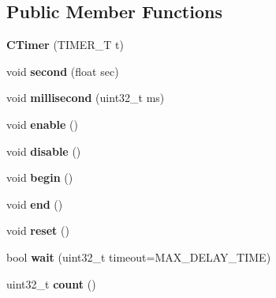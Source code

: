 \subsection*{Public Member Functions}
\begin{DoxyCompactItemize}
\item 
\hypertarget{class_c_timer_a01988907cb23d887bf9db237ecac1d8f}{{\bfseries C\-Timer} (T\-I\-M\-E\-R\-\_\-\-T t)}\label{class_c_timer_a01988907cb23d887bf9db237ecac1d8f}

\item 
\hypertarget{class_c_timer_aa4d48f568d057eccc1842748034fadbf}{void {\bfseries second} (float sec)}\label{class_c_timer_aa4d48f568d057eccc1842748034fadbf}

\item 
\hypertarget{class_c_timer_a80328fea91b61d9ffb154671b5cae6df}{void {\bfseries millisecond} (uint32\-\_\-t ms)}\label{class_c_timer_a80328fea91b61d9ffb154671b5cae6df}

\item 
\hypertarget{class_c_timer_aeffc80e8f34a8c1e5e0850da92b7ee17}{void {\bfseries enable} ()}\label{class_c_timer_aeffc80e8f34a8c1e5e0850da92b7ee17}

\item 
\hypertarget{class_c_timer_a61c79a568b4337520ed58e5f248a068e}{void {\bfseries disable} ()}\label{class_c_timer_a61c79a568b4337520ed58e5f248a068e}

\item 
\hypertarget{class_c_timer_ab94e07fab4cea184d1b02de1c9435b02}{void {\bfseries begin} ()}\label{class_c_timer_ab94e07fab4cea184d1b02de1c9435b02}

\item 
\hypertarget{class_c_timer_a7258888c2b3954fa3922201595e562a8}{void {\bfseries end} ()}\label{class_c_timer_a7258888c2b3954fa3922201595e562a8}

\item 
\hypertarget{class_c_timer_a6234aac53e301116247e33254cd2f585}{void {\bfseries reset} ()}\label{class_c_timer_a6234aac53e301116247e33254cd2f585}

\item 
\hypertarget{class_c_timer_a9e63f073da87bd67b2afded332d2aa2d}{bool {\bfseries wait} (uint32\-\_\-t timeout=M\-A\-X\-\_\-\-D\-E\-L\-A\-Y\-\_\-\-T\-I\-M\-E)}\label{class_c_timer_a9e63f073da87bd67b2afded332d2aa2d}

\item 
\hypertarget{class_c_timer_a54ec6171b2f4f7af4fd5f3b43a486d02}{uint32\-\_\-t {\bfseries count} ()}\label{class_c_timer_a54ec6171b2f4f7af4fd5f3b43a486d02}

\end{DoxyCompactItemize}
